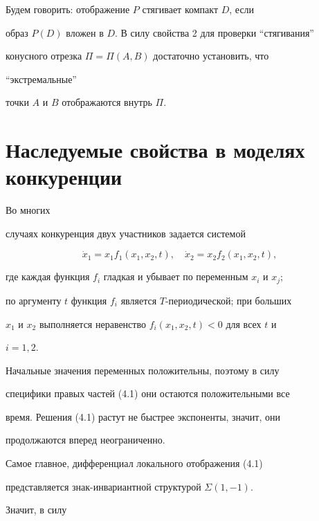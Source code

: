  


Будем говорить: отображение $P$ стягивает компакт $D$, если 


образ $P(D)$ вложен в $D$. В силу свойства 2 для проверки ``стягивания'' 


конусного отрезка $\Pi=\Pi(A,B)$ достаточно установить, что 


``экстремальные'' 


точки $A$ и $B$ отображаются внутрь $\Pi$. 


 


 


\section{Наследуемые свойства в моделях конкуренции} 


 


Во многих 


случаях конкуренция двух участников задается системой 


\begin{equation} 


\Dot x_1=x_1f_1(x_1,x_2,t),\quad 


\Dot x_2=x_2f_2(x_1,x_2,t), 


\end{equation} 


где каждая функция $f_i$ гладкая и убывает по переменным $x_i$ и $x_j$; 


по аргументу $t$ функция $f_i$ является $T$-периодической; при больших 


$x_1$ и $x_2$ выполняется неравенство $f_i(x_1,x_2,t)<0$ для всех $t$ и 


$i=1,2$. 


Начальные значения переменных положительны, поэтому в силу 


специфики правых частей (4.1) они остаются положительными все 


время. Решения (4.1) растут не быстрее экспоненты, значит, они 


продолжаются вперед неограниченно. 


 


Самое главное, дифференциал локального отображения (4.1) 


представляется знак-ин\-ва\-ри\-ант\-ной структурой $\Sigma(1,-1)$.


Значит, в силу 


